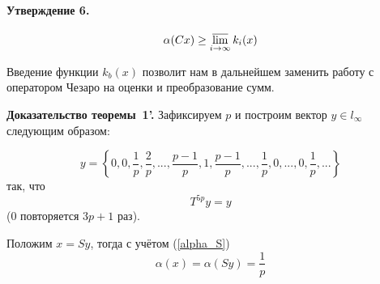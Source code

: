 \documentclass[a5paper,12pt,openbib]{report}
\begin{document}
\paragraph{Утверждение 6.}
\begin{equation}\label{alpha_greater_k_b}
	\alpha (Cx) \geq \varlimsup_{i\to \infty} k_i(x)
\end{equation}

Введение функции $k_b(x)$ позволит нам в дальнейшем заменить работу с оператором Чезаро
на оценки и преобразование сумм.

\textbf{Доказательство теоремы~1'.}
Зафиксируем $p$ и построим вектор $y\in l_\infty$ следующим образом:

\begin{equation}\label{y_construction}
	y = \left\{
		0, 0, \frac{1}{p}, \frac{2}{p}, %
		...,
		\frac{p-1}{p}, 1, \frac{p-1}{p},
		...,
		\frac{1}{p},
		0, ..., 0,
		\frac{1}{p}, ...
	\right\}
\end{equation}
так, что
\begin{equation}\label{T_y}
	T^{5p}y = y
\end{equation}
(0 повторяется $3p+1$ раз).

Положим $x = Sy$, тогда с учётом (\ref{alpha_S})
\begin{equation}\label{alpha_x}
	\alpha (x) = \alpha (Sy) = \frac{1}{p}
\end{equation}
\end{document}
